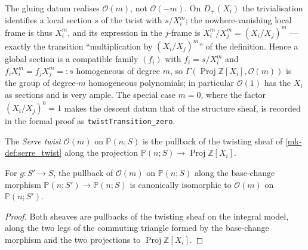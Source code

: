 \begin{remark}
  \label{mk-rem:serre_twist_sign}
  The gluing datum realises \(\mathcal{O}(m)\), not \(\mathcal{O}(-m)\).  On
  \(D_+(X_i)\) the trivialisation identifies a local section \(s\) of the twist
  with \(s/X_i^m\); the nowhere-vanishing local frame is thus \(X_i^m\), and its
  expression in the \(j\)-frame is \(X_i^m/X_j^m = (X_i/X_j)^m\) — exactly the
  transition ``multiplication by \((X_i/X_j)^m\)'' of the definition.  Hence a
  global section is a compatible family \((f_i)\) with \(f_i = s/X_i^m\) and
  \(f_i X_i^m = f_j X_j^m =: s\) homogeneous of degree \(m\), so
  \(\Gamma(\operatorname{Proj}\mathbb{Z}[X_i], \mathcal{O}(m))\) is the group of
  degree-\(m\) homogeneous polynomials; in particular \(\mathcal{O}(1)\) has the
  \(X_i\) as sections and is very ample.  The special case \(m = 0\), where the
  factor \((X_i/X_j)^0 = 1\) makes the descent datum that of the structure sheaf,
  is recorded in the formal proof as \texttt{twistTransition\_zero}.
\end{remark}

\begin{definition}
  \label{mk-def:twisting_sheaf}
  \leanok
  The \emph{Serre twist} \(\mathcal{O}(m)\) on \(\mathbb{P}(n; S)\) is the
  pullback of the twisting sheaf of \ref{mk-def:serre_twist} along the
  projection \(\mathbb{P}(n; S) \to \operatorname{Proj} \mathbb{Z}[X_i]\).
\end{definition}

\begin{lemma}
  \label{mk-lem:twisting_sheaf_base_change}
  \leanok
  For \(g : S' \to S\), the pullback of \(\mathcal{O}(m)\) on
  \(\mathbb{P}(n; S)\) along the base-change morphism
  \(\mathbb{P}(n; S') \to \mathbb{P}(n; S)\) is canonically isomorphic to
  \(\mathcal{O}(m)\) on \(\mathbb{P}(n; S')\).
\end{lemma}

\begin{proof}
  \leanok
  Both sheaves are pullbacks of the twisting sheaf on the integral model,
  along the two legs of the commuting triangle formed by the base-change
  morphism and the two projections to
  \(\operatorname{Proj} \mathbb{Z}[X_i]\).
\end{proof}

